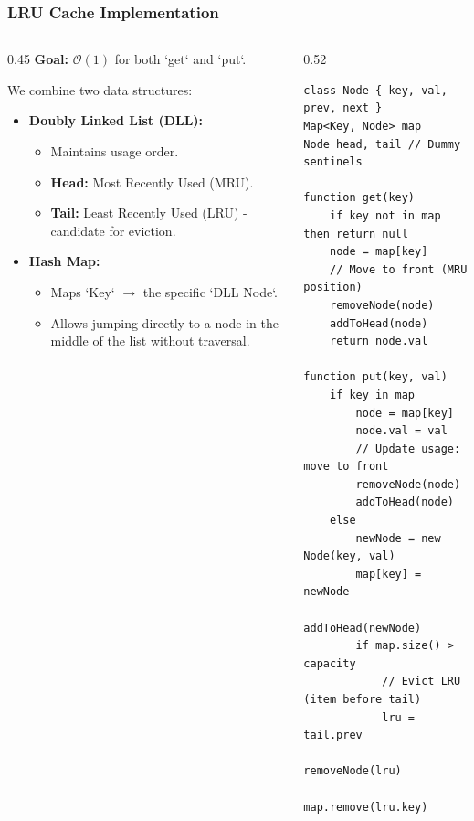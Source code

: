 \documentclass[8pt,aspectratio=169]{beamer}
\begin{document}
\begin{frame}[fragile]
\frametitle{LRU Cache Implementation}

\begin{columns}[T]
    \begin{column}{0.45\textwidth}
        \textbf{Goal:} $\mathcal{O}(1)$ for both `get` and `put`.
        
        \vspace{0.5em}
        We combine two data structures:
        \begin{itemize}
            \item \textbf{Doubly Linked List (DLL):}
            \begin{itemize}
                \item Maintains usage order.
                \item \textbf{Head:} Most Recently Used (MRU).
                \item \textbf{Tail:} Least Recently Used (LRU) - candidate for eviction.
            \end{itemize}
            \item \textbf{Hash Map:}
            \begin{itemize}
                \item Maps `Key` $\to$ the specific `DLL Node`.
                \item Allows jumping directly to a node in the middle of the list without traversal.
            \end{itemize}
        \end{itemize}
    \end{column}

    \begin{column}{0.52\textwidth}
    \begin{lstlisting}[basicstyle=\tiny\ttfamily, frame=single]
class Node { key, val, prev, next }
Map<Key, Node> map
Node head, tail // Dummy sentinels

function get(key)
    if key not in map then return null
    node = map[key]
    // Move to front (MRU position)
    removeNode(node)
    addToHead(node)
    return node.val

function put(key, val)
    if key in map
        node = map[key]
        node.val = val
        // Update usage: move to front
        removeNode(node)
        addToHead(node)
    else
        newNode = new Node(key, val)
        map[key] = newNode
        addToHead(newNode)
        if map.size() > capacity
            // Evict LRU (item before tail)
            lru = tail.prev
            removeNode(lru)
            map.remove(lru.key)
\end{lstlisting}
    \end{column}
\end{columns}

\end{frame}
\end{document}
